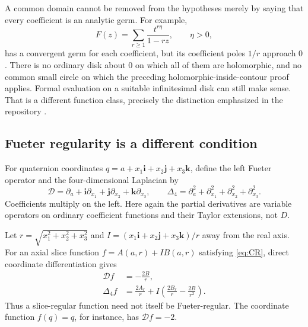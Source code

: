 \documentclass[11pt,letterpaper]{article}
\numberwithin{equation}{section}
\theoremstyle{definition}
\theoremstyle{remark}
\newcommand{\ii}{\mathbf i}
\newcommand{\jj}{\mathbf j}
\newcommand{\kk}{\mathbf k}
\newcommand{\DD}{\mathcal D}
\begin{document}
A common domain cannot be removed from the hypotheses merely by saying that every
coefficient is an analytic germ. For example,
\begin{equation}\label{eq:nocommondomain}
 F(z)=\sum_{r\ge1}\frac{t^{r\eta}}{1-rz},\qquad \eta>0,
\end{equation}
has a convergent germ for each coefficient, but its coefficient poles $1/r$ approach $0$.
There is no ordinary disk about $0$ on which all of them are holomorphic, and no common
small circle on which the preceding holomorphic-inside-contour proof applies. Formal
evaluation on a suitable infinitesimal disk can still make sense. That is a different
function class, precisely the distinction emphasized in the repository \cite{RepoDocs}.

\subsection{Fueter regularity is a different condition}\label{sec:fueter}
For quaternion coordinates $q=a+x_1\ii+x_2\jj+x_3\kk$, define the left Fueter operator and
the four-dimensional Laplacian by
\[
 \DD=\partial_a+\ii\partial_{x_1}+\jj\partial_{x_2}+\kk\partial_{x_3},
 \qquad
 \Delta_4=\partial_a^2+\partial_{x_1}^2+\partial_{x_2}^2+\partial_{x_3}^2.
\]
Coefficients multiply on the left. Here again the partial derivatives are variable
operators on ordinary coefficient functions and their Taylor extensions, not $D$.

Let $r=\sqrt{x_1^2+x_2^2+x_3^2}$ and $I=(x_1\ii+x_2\jj+x_3\kk)/r$ away from the real
axis. For an axial slice function $f=A(a,r)+I B(a,r)$ satisfying \eqref{eq:CR}, direct
coordinate differentiation gives
\begin{align}
 \DD f&=-\frac{2B}{r},\label{eq:fueterslice}\\
 \Delta_4 f&=\frac{2A_r}{r}
       +I\left(\frac{2B_r}{r}-\frac{2B}{r^2}\right).\label{eq:fuetertransform}
\end{align}
Thus a slice-regular function need not itself be Fueter-regular. The coordinate function
$f(q)=q$, for instance, has $\DD f=-2$.
\end{document}
